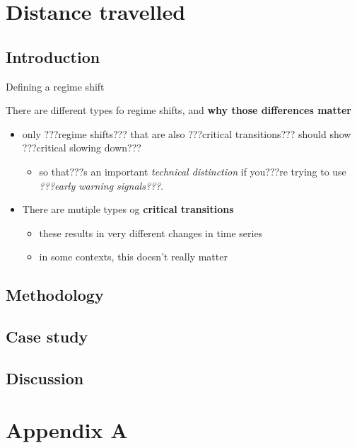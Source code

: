\documentclass[12pt,twoside,openany]{reedthesis}
\providecommand{\tightlist}{%
  \setlength{\itemsep}{0pt}\setlength{\parskip}{0pt}}
\begin{document}
\chapter{Distance travelled}\label{distanceTravelled}

\section{Introduction}\label{introduction-3}

Defining a regime shift

There are different types fo regime shifts, and \textbf{why those
differences matter}
\begin{itemize}
\tightlist
\item
  only ???regime shifts??? that are also ???critical transitions???
  should show ???critical slowing down???
  \begin{itemize}
  \tightlist
  \item
    so that???s an important \emph{technical distinction} if you???re
    trying to use \emph{???early warning signals???}.\\
  \end{itemize}
\item
  There are mutiple types og \textbf{critical transitions}
  \begin{itemize}
  \tightlist
  \item
    these results in very different changes in time series\\
  \item
    in some contexts, this doesn't really matter
  \end{itemize}
\end{itemize}
\section{Methodology}\label{methodology}

\section{Case study}\label{case-study-1}

\section{Discussion}\label{discussion-2}

\chapter*{Appendix A}\label{rRDM}
\end{document}
